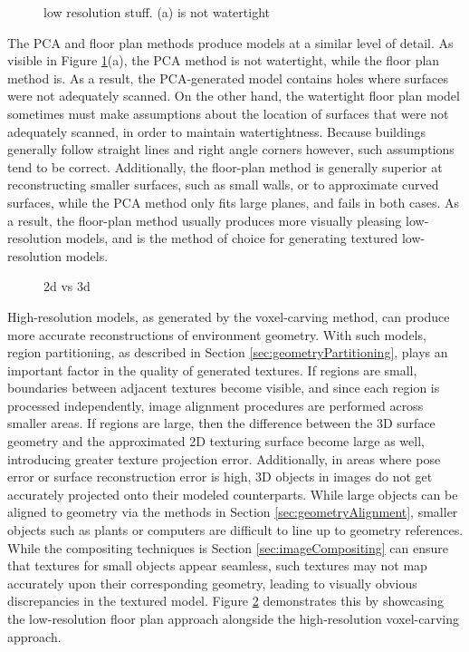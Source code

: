 \message{ !name(masters.tex)}\documentclass[]{spie}  %
\begin{document}
\begin{figure}
  \centering
  \caption{low resolution stuff. (a) is not watertight}
  \label{fig:lowresmodels}
\end{figure}

The PCA and floor plan methods produce models at a similar level of
detail. As visible in Figure \ref{fig:lowresmodels}(a), the PCA method
is not watertight, while the floor plan method is. As a result, the
PCA-generated model contains holes where surfaces were not adequately
scanned. On the other hand, the watertight floor plan model sometimes
must make assumptions about the location of surfaces that were not
adequately scanned, in order to maintain watertightness. Because
buildings generally follow straight lines and right angle corners
however, such assumptions tend to be correct. Additionally, the
floor-plan method is generally superior at reconstructing smaller
surfaces, such as small walls, or to approximate curved surfaces,
while the PCA method only fits large planes, and fails in both
cases. As a result, the floor-plan method usually produces more
visually pleasing low-resolution models, and is the method of choice
for generating textured low-resolution models.

\begin{figure}
  \caption{2d vs 3d}
  \label{fig:2dvs3d}
\end{figure}

High-resolution models, as generated by the voxel-carving method, can
produce more accurate reconstructions of environment geometry. With
such models, region partitioning, as described in Section
\ref{sec:geometryPartitioning}, plays an important factor in the
quality of generated textures. If regions are small, boundaries
between adjacent textures become visible, and since each region is
processed independently, image alignment procedures are performed
across smaller areas. If regions are large, then the difference
between the 3D surface geometry and the approximated 2D texturing
surface become large as well, introducing greater texture projection
error. Additionally, in areas where pose error or surface
reconstruction error is high, 3D objects in images do not get
accurately projected onto their modeled counterparts. While large
objects can be aligned to geometry via the methods in Section
\ref{sec:geometryAlignment}, smaller objects such as plants or
computers are difficult to line up to geometry references. While the
compositing techniques is Section \ref{sec:imageCompositing} can
ensure that textures for small objects appear seamless, such textures
may not map accurately upon their corresponding geometry, leading to
visually obvious discrepancies in the textured model. Figure
\ref{fig:2dvs3d} demonstrates this by showcasing the low-resolution
floor plan approach alongside the high-resolution voxel-carving
approach.
\end{document}
